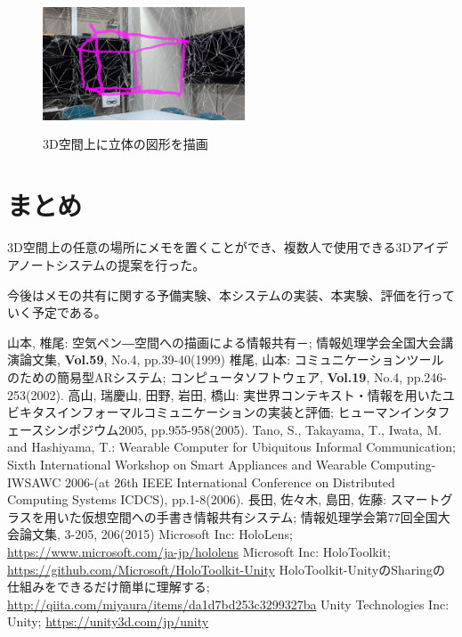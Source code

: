 \documentclass[twocolumn, a4paper]{UECIEresume}
\begin{document}
\begin{figure}[h]
  \begin{center}
    \includegraphics[clip,height=4.0cm,width=6.0cm]{./rittai.eps}
    \caption{3D空間上に立体の図形を描画}
    \label{fig:rittai}
  \end{center}
\end{figure}

\section{まとめ}
3D空間上の任意の場所にメモを置くことができ、複数人で使用できる3Dアイデアノートシステムの提案を行った。

今後はメモの共有に関する予備実験、本システムの実装、本実験、評価を行っていく予定である。

{\small
\begin{thebibliography}{99}
        山本, 椎尾:
        空気ペン―空間への描画による情報共有－;
        情報処理学会全国大会講演論文集,
        {\bf Vol.59}, No.4, pp.39-40(1999)
	椎尾, 山本:
	コミュニケーションツールのための簡易型ARシステム;
	コンピュータソフトウェア, 
        {\bf Vol.19}, No.4, pp.246-253(2002).
	高山, 瑞慶山, 田野, 岩田, 橋山:
	実世界コンテキスト・情報を用いたユビキタスインフォーマルコミュニケーションの実装と評価;
	ヒューマンインタフェースシンポジウム2005,
        pp.955-958(2005).
        Tano, S., Takayama, T., Iwata, M. and Hashiyama, T.:
        Wearable Computer for Ubiquitous Informal Communication;
        Sixth International Workshop on Smart Appliances and Wearable Computing-IWSAWC 2006-(at 26th IEEE International Conference on Distributed Computing Systems ICDCS),
        pp.1-8(2006).
        長田, 佐々木, 島田, 佐藤:
        スマートグラスを用いた仮想空間への手書き情報共有システム;
        情報処理学会第77回全国大会論文集,
        3-205, 206(2015)
        Microsoft Inc:
        HoloLens;
        \url{https://www.microsoft.com/ja-jp/hololens}
        Microsoft Inc:
        HoloToolkit;
        \url{https://github.com/Microsoft/HoloToolkit-Unity}
        HoloToolkit-UnityのSharingの仕組みをできるだけ簡単に理解する; 
        \url{http://qiita.com/miyaura/items/da1d7bd253c3299327ba}
        Unity Technologies Inc:
        Unity;
        \url{https://unity3d.com/jp/unity}

\end{thebibliography}
}
\end{document}
